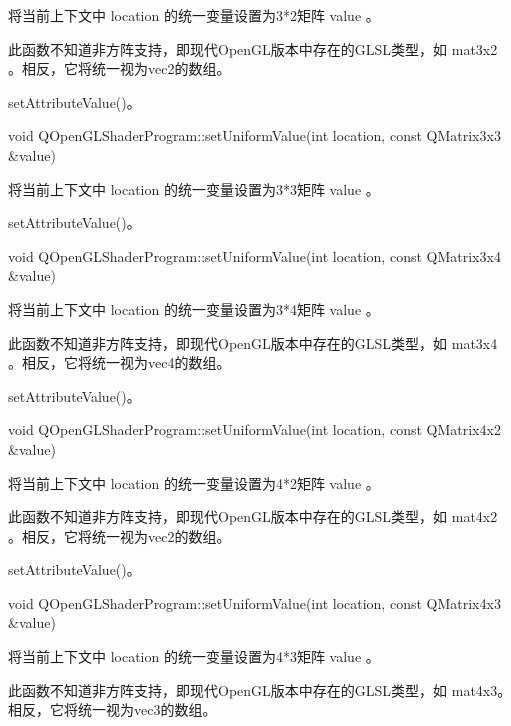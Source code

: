 将当前上下文中 location 的统一变量设置为3*2矩阵 value 。

\begin{notice}
此函数不知道非方阵支持，即现代OpenGL版本中存在的GLSL类型，如 mat3x2 。相反，它将统一视为vec2的数组。
\end{notice}

\begin{seeAlso}
setAttributeValue()。
\end{seeAlso}

void QOpenGLShaderProgram::setUniformValue(int location, const QMatrix3x3 \&value)

将当前上下文中 location 的统一变量设置为3*3矩阵 value 。

\begin{seeAlso}
setAttributeValue()。
\end{seeAlso}

void QOpenGLShaderProgram::setUniformValue(int location, const QMatrix3x4 \&value)

将当前上下文中 location 的统一变量设置为3*4矩阵 value 。

\begin{notice}
此函数不知道非方阵支持，即现代OpenGL版本中存在的GLSL类型，如 mat3x4 。相反，它将统一视为vec4的数组。
\end{notice}

\begin{seeAlso}
setAttributeValue()。
\end{seeAlso}

void QOpenGLShaderProgram::setUniformValue(int location, const QMatrix4x2 \&value)

将当前上下文中 location 的统一变量设置为4*2矩阵 value 。

\begin{notice}
此函数不知道非方阵支持，即现代OpenGL版本中存在的GLSL类型，如 mat4x2 。相反，它将统一视为vec2的数组。
\end{notice}

\begin{seeAlso}
setAttributeValue()。
\end{seeAlso}

void QOpenGLShaderProgram::setUniformValue(int location, const QMatrix4x3 \&value)

将当前上下文中 location 的统一变量设置为4*3矩阵 value 。

\begin{notice}
此函数不知道非方阵支持，即现代OpenGL版本中存在的GLSL类型，如 mat4x3。相反，它将统一视为vec3的数组。
\end{notice}

